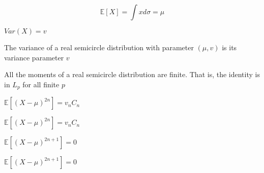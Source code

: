 




\begin{lemma}\label{lem:integral_id_semicircleReal}
  \notready
  $$\mathbb{E}[X] = \int x d \sigma = \mu$$
\end{lemma}

\begin{lemma}\label{lem:variance_fun_id_semicircleReal}
  \notready
  $Var(X) = v$
\end{lemma}


\begin{lemma}\label{lem:variance_id_semicircleReal}
  \notready
  The variance of a real semicircle distribution with parameter $(\mu, v)$ is
  its variance parameter $v$
\end{lemma}


\begin{lemma}\label{lem:memLp_id_semicircleReal}
  \notready
  All the moments of a real semicircle distribution are finite. That is, the identity is in $L_p$ for
  all finite $p$
\end{lemma}


\begin{lemma}\label{lem:centralMoment_two_mul_semicircleReal}
  \notready
   $\mathbb{E}[(X  - \mu)^{2n}] = v_n C_n $
\end{lemma}

\begin{lemma}\label{lem:centralMoment_fun_two_mul_semicircleReal}
  \notready
   $\mathbb{E}[(X  - \mu)^{2n}] = v_n C_n $
\end{lemma}

\begin{lemma}\label{lem:centralMoment_odd_semicircleReal}
  \notready
  $\mathbb{E}[(X  - \mu)^{2n + 1}] = 0 $
\end{lemma}

\begin{lemma}\label{lem:centralMoment_fun_odd_semicircleReal}
  \notready
   $\mathbb{E}[(X  - \mu)^{2n + 1}] = 0 $
\end{lemma}



